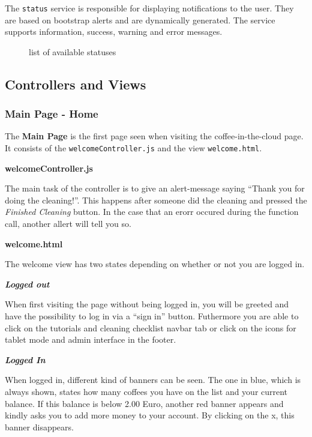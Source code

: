 The \texttt{status} service is responsible for displaying notifications
to the user. They are based on bootstrap alerts and are dynamically
generated. The service supports information, success, warning and error
messages.

\begin{figure}[htbp]
\centering
{}
\caption{list of available statuses}
\end{figure}

\subsection{Controllers and Views}\label{controllers-and-views}

\subsubsection{Main Page - Home}\label{main-page---home}

The \textbf{Main Page} is the first page seen when visiting the
coffee-in-the-cloud page. It consists of the
\texttt{welcomeController.js} and the view \texttt{welcome.html}.

\textbf{welcomeController.js}

The main task of the controller is to give an alert-message saying
``Thank you for doing the cleaning!''. This happens after someone did
the cleaning and pressed the \emph{Finished Cleaning} button. In the
case that an erorr occured during the function call, another allert will
tell you so.

\textbf{welcome.html}

The welcome view has two states depending on whether or not you are
logged in.

\textbf{\emph{Logged out}}

When first visiting the page without being logged in, you will be
greeted and have the possibility to log in via a ``sign in'' button.
Futhermore you are able to click on the tutorials and cleaning checklist
navbar tab or click on the icons for tablet mode and admin interface in
the footer.

\textbf{\emph{Logged In}}

When logged in, different kind of banners can be seen. The one in blue,
which is always shown, states how many coffees you have on the list and
your current balance. If this balance is below 2.00 Euro, another red
banner appears and kindly asks you to add more money to your account. By
clicking on the x, this banner disappears.

